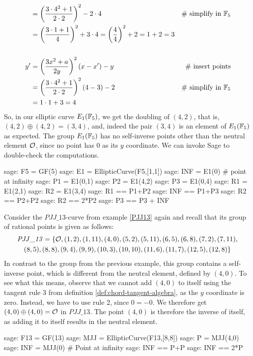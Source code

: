 \begin{example}
\begin{align*}
    & = \left(\frac{3\cdot 4^2+1}{2\cdot 2}\right)^2 -2\cdot 4 & \text{\# simplify in } \mathbb{F}_5 \\
    & = \left(\frac{3\cdot 1+1}{4}\right)^2 +3\cdot 4
      = \left(\frac{4}{4}\right)^2 +2
      = 1 +2 
      = 3
\\
\\
y'  & = \left(\frac{3x^2+a}{2y}\right)^2\left(x-x'\right) - y  & \text{\# insert points} \\
    & = \left(\frac{3\cdot 4^2+1}{2\cdot 2}\right)^2\left(4-3\right) - 2 & \text{\# simplify in } \mathbb{F}_5\\
    & = 1\cdot 1 + 3
      = 4
\end{align*}
So, in our elliptic curve $E_1(\mathbb{F}_5)$, we get the doubling  of $(4,2)$, that is, $(4,2)\oplus (4,2) =(3,4)$, and, indeed the pair $(3,4)$ is an element of $E_1(\mathbb{F}_5)$ as expected. The group $E_1(\mathbb{F}_5)$ has no self-inverse points other than the neutral element $\mathcal{O}$, since no point has $0$ as its $y$ coordinate. We can invoke Sage to double-check the computations. 
\begin{sagecommandline}
sage: F5 = GF(5)
sage: E1 = EllipticCurve(F5,[1,1])
sage: INF = E1(0) # point at infinity
sage: P1 = E1(0,1)
sage: P2 = E1(4,2)
sage: P3 = E1(0,4)
sage: R1 = E1(2,1)
sage: R2 = E1(3,4)
sage: R1 == P1+P2
sage: INF == P1+P3
sage: R2 == P2+P2
sage: R2 == 2*P2
sage: P3 == P3 + INF
\end{sagecommandline}
\end{example}
\begin{example}\label{ex:PJJ13-self-inverse} Consider the $\mathit{PJJ\_13}$-curve from example \ref{PJJ13} again and recall that its group of rational points is given as follows:
\begin{multline*}
\mathit{PJJ\_13} = \{\mathcal{O}, (1, 2), (1, 11), (4, 0), (5, 2), (5, 11), (6, 5), (6, 8), (7,2), (7, 11), \\ (8, 5), (8, 8), (9, 4), (9, 9), (10, 3), (10,
10), (11, 6), (11, 7), (12, 5), (12, 8)\}
\end{multline*}
In contrast to the group from the previous example, this group contains a self-inverse point, which is different from the neutral element, defined by $(4,0)$. To see what this means, observe that we cannot add $(4,0)$ to itself using the tangent rule 3 from definition \ref{def:chord-tangent-algebra}, as the $y$ coordinate is zero. Instead, we have to use rule 2, since $0=-0$. We therefore get $(4,0)\oplus (4,0)=\mathcal{O}$ in $\mathit{PJJ\_13}$. The point $(4,0)$ is therefore the inverse of itself, as adding it to itself results in the neutral element. 
\begin{sagecommandline}
sage: F13 = GF(13)
sage: MJJ = EllipticCurve(F13,[8,8])
sage: P = MJJ(4,0)
sage: INF = MJJ(0) # Point at infinity
sage: INF == P+P
sage: INF == 2*P
\end{sagecommandline}
\end{example}

